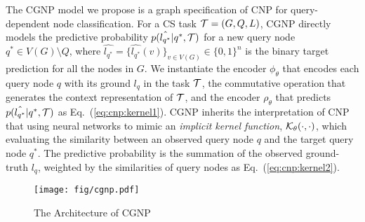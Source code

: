 %
The CGNP model we propose is a graph specification of CNP for
query-dependent node classification. 
For a CS task $\mathcal{T} = (G, Q,
L)$, CGNP directly models the predictive probability $p(\hat{l_{q^*}}
| q^*, \mathcal{T})$ for a new query node $q^* \in V(G) \setminus Q$, where
$\hat{l_{q^*}} = \{ \hat{l_{q^*}}(v) \}_{v \in V(G)} \in \{0, 1\}^{n}$
is the binary target prediction for all the nodes in $G$.  
We instantiate the encoder $\phi_{\theta}$ that encodes each query node $q$ with its ground $l_q$ in the task $\mathcal{T}$,
the commutative operation that generates the context representation of $\mathcal{T}$, and the encoder $\rho_{\theta}$ that predicts $p(\hat{l_{q^*}}| q^*, \mathcal{T})$ as Eq.~(\ref{eq:cnp:kernel1}).
CGNP inherits the interpretation of CNP~\cite{CNP} that using neural networks to mimic an \emph{implicit kernel function}, $\mathcal{K}_\theta(\cdot, \cdot)$, which evaluating the  similarity between an observed query node $q$ and the target query node $q^*$.
The predictive probability is the summation of the observed ground-truth $l_q$, weighted by the similarities of query nodes as Eq.~(\ref{eq:cnp:kernel2}).

\begin{figure*}[t] 
	\centering 
	\texttt{[image: fig/cgnp.pdf]} 
	\vspace{-0.3cm}
	\caption{The Architecture of CGNP} 
	\vspace{-0.5cm}
	\label{fig:cgnp} 
\end{figure*}

